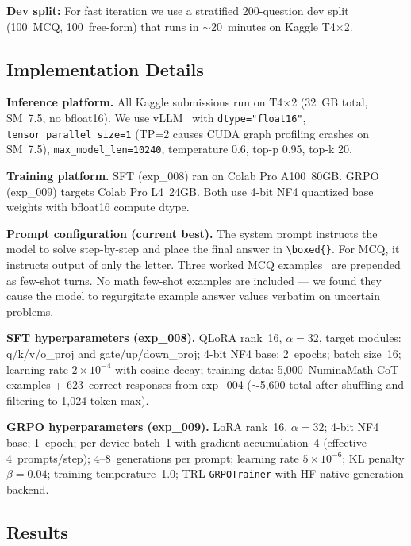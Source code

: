 \documentclass{article}
\begin{document}
\textbf{Dev split:} For fast iteration we use a stratified 200-question dev split (100~MCQ, 100~free-form) that runs in ${\sim}$20~minutes on Kaggle T4$\times$2.

\subsection{Implementation Details}
\label{sec:implementation_details}

\textbf{Inference platform.} All Kaggle submissions run on T4$\times$2 (32~GB total, SM~7.5, no bfloat16). We use vLLM~\cite{kwon2023efficient} with \texttt{dtype="float16"}, \texttt{tensor\_parallel\_size=1} (TP=2 causes CUDA graph profiling crashes on SM~7.5), \texttt{max\_model\_len=10240}, temperature 0.6, top-p 0.95, top-k 20.

\textbf{Training platform.} SFT (exp\_008) ran on Colab Pro A100~80GB. GRPO (exp\_009) targets Colab Pro L4~24GB. Both use 4-bit NF4 quantized base weights with bfloat16 compute dtype.

\textbf{Prompt configuration (current best).} The system prompt instructs the model to solve step-by-step and place the final answer in \verb|\boxed{}|. For MCQ, it instructs output of only the letter. Three worked MCQ examples~\cite{brown2020language} are prepended as few-shot turns. No math few-shot examples are included --- we found they cause the model to regurgitate example answer values verbatim on uncertain problems.

\textbf{SFT hyperparameters (exp\_008).} QLoRA rank~16, $\alpha{=}32$, target modules: q/k/v/o\_proj and gate/up/down\_proj; 4-bit NF4 base; 2~epochs; batch size~16; learning rate $2{\times}10^{-4}$ with cosine decay; training data: 5,000~NuminaMath-CoT examples + 623~correct responses from exp\_004 (${\sim}$5,600 total after shuffling and filtering to 1,024-token max).

\textbf{GRPO hyperparameters (exp\_009).} LoRA rank~16, $\alpha{=}32$; 4-bit NF4 base; 1~epoch; per-device batch~1 with gradient accumulation~4 (effective 4~prompts/step); 4--8~generations per prompt; learning rate $5{\times}10^{-6}$; KL penalty $\beta{=}0.04$; training temperature~1.0; TRL \texttt{GRPOTrainer} with HF native generation backend.

\subsection{Results}
\label{sec:results}
\end{document}
